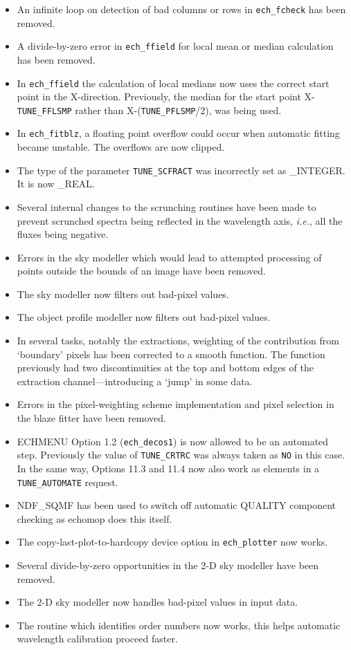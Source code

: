 \documentclass[11pt,twoside]{article}
\newcommand{\htmlref}[2]{#1}
\newcommand{\sunspec}[2]{#1}
\renewcommand{\sunspec}[2]{#2}
\begin{document}
\begin{itemize}
\item An infinite loop on detection of bad columns or rows in {\tt ech\_fcheck}
   has been removed.
\item A divide-by-zero error in {\tt ech\_ffield} for local mean or median
   calculation has been removed.
\item In {\tt ech\_ffield} the calculation of local medians now uses the correct
   start point in the X-direction.  Previously, the median for the start
   point X\sunspec{$-$}{-}{\tt{TUNE\_FFLSMP}} rather than
   X\sunspec{$-$}{-}({\tt{TUNE\_PFLSMP}}/2), was being used.
\item In {\tt ech\_fitblz}, a floating point overflow could occur when automatic
   fitting became unstable.  The overflows are now clipped.
\item The type of the parameter
   \htmlref{{\tt{TUNE\_SCFRACT}}}{par_TUNE_SCFRACT} was incorrectly set as
   \_INTEGER.  It is now \_REAL.
\item Several internal changes to the scrunching routines have been made to
   prevent scrunched spectra being reflected in the wavelength axis,
   {\it{i.e.}}, all the fluxes being negative.
\item Errors in the sky modeller which would lead to attempted processing
   of points outside the bounds of an image have been removed.
\item The sky modeller now filters out bad-pixel values.
\item The object profile modeller now filters out bad-pixel values.
\item In several tasks, notably the extractions, weighting of the
   contribution from `boundary' pixels has been corrected to a smooth
   function.  The function previously had two discontinuities at the top
   and bottom edges of the extraction channel---introducing a `jump' in
   some data.
\item Errors in the pixel-weighting scheme implementation and pixel
   selection in the blaze fitter have been removed.
\item ECHMENU Option 1.2 ({\tt{ech\_decos1}}) is now allowed to be an automated
   step. Previously the value of \htmlref{{\tt{TUNE\_CRTRC}}}{par_TUNE_CRTRC}
   was always taken as \texttt{NO} in
   this case.  In the same way, Options 11.3 and 11.4 now also work as
   elements in a {\tt TUNE\_AUTOMATE} request.
\item NDF\_SQMF has been used to switch off automatic QUALITY component
   checking as {\sc echomop} does this itself.
\item The copy-last-plot-to-hardcopy device option in {\tt ech\_plotter}
   now works.
\item Several divide-by-zero opportunities in the 2-D sky modeller have been
   removed.
\item The 2-D sky modeller now handles bad-pixel values in input data.
\item The routine which identifies order numbers now works, this helps
   automatic wavelength calibration proceed faster.
\end{itemize}
\end{document}

